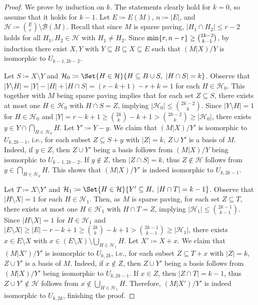 \documentclass{article}
\DeclarePairedDelimiter{\set}{\{}{\}}
\theoremstyle{definition}
\newcommand{\cH}{\mathcal{H}}
\begin{document}
\begin{proof}
We prove by induction on $k$. The statements clearly hold for $k=0$, so assume that it holds for $k-1$. Let $E\coloneqq E(M)$, $n \coloneqq |E|$, and $\cH\coloneqq \binom{E}{r} \setminus \mathcal{B}(M)$.
Recall that since $M$ is sparse paving, $|H_1 \cap H_2| \le r-2$ holds for all $H_1, H_2\in \cH$ with $H_1 \ne H_2$.
Since $\min\set{r, n-r} \ge \binom{2k-2}{k-1}$, by induction there exist $X, Y$ with $Y \subseteq B \subseteq X \subseteq E$ such that $(M|X) / Y$ is isomorphic to $U_{k-1, 2k-2}$.

Let $S\coloneqq X \setminus Y$ and $\cH_0 \coloneqq \Set{H\in \cH}{H \subseteq B\cup S,\ |H\cap S| = k}$.
Observe that $|Y \setminus H| = |Y|-|H|+|H\cap S| = (r-k+1) - r + k = 1$ for each $H\in \cH_0$.
This together with $M$ being sparse paving implies that for each set $Z\subseteq S$, there exists at most one $H\in \cH_0$ with $H\cap S = Z$, implying $|\cH_0| \le \binom{2k-2}{k}$.
Since $|Y \setminus H| = 1$ for $H \in \cH_0$ and $|Y| = r-k+1 \ge \binom{2k}{k}-k+1 > \binom{2k-2}{k} \ge |\cH_0|$, there exists $y\in Y \cap \bigcap_{H \in \cH_0} H$.
Let $Y'\coloneqq Y-y$.
We claim that $(M|X)/ Y'$ is isomorphic to $U_{k, 2k-1}$, i.e., for each subset $Z\subseteq S + y$ with $|Z|=k$, $Z \cup Y'$ is a basis of $M$.
Indeed, if $y \in Z$, then $Z \cup Y'$ being a basis follows from $(M|X) / Y$ being isomorphic to $U_{k-1, 2k-2}$.
If $y \notin Z$, then $|Z\cap S| = k$, thus $Z\not \in \cH$ follows from $y \in \bigcap_{H \in \cH_0} H$.
This shows that $(M|X)/ Y'$ is indeed isomorphic to $U_{k, 2k-1}$.

Let $T\coloneqq X \setminus Y'$ and $\cH_1\coloneqq \Set{H \in \cH}{Y' \subseteq H,\ |H\cap T| = k-1}$.
Observe that $|H\setminus X| = 1$ for each $H\in \cH_1$.
Then, as $M$ is sparse paving, for each set $Z\subseteq T$, there exists at most one $H\in \cH_1$ with $H\cap T =Z$, implying $|\cH_1| \le \binom{2k-1}{k-1}$.
Since $|H \setminus X|=1$ for $H\in \cH_1$ and $|E \setminus X| \ge |E|-r -k+1 \ge \binom{2k}{k}-k+1 > \binom{2k-1}{k-1} \ge |\cH_1|$, there exists $x \in E \setminus X$ with $x \in (E \setminus X) \setminus \bigcup_{H \in \cH_1} H$.
Let $X'\coloneqq X + x$.
We claim that $(M|X') / Y'$ is isomorphic to $U_{k, 2k}$, i.e., for each subset $Z\subseteq T + x$ with $|Z|=k$, $Z \cup Y'$ is a basis of $M$.
Indeed, if $x \notin Z$, then $Z \cup Y'$ being a basis follows from $(M|X)/ Y'$ being isomorphic to $U_{k, 2k-1}$.
If $x \in Z$, then $|Z\cap T| = k-1$, thus $Z \cup Y' \notin \cH$ follows from $x \not \in \bigcup_{H\in \cH_1} H$.
Therefore, $(M|X') / Y'$ is indeed isomorphic to $U_{k, 2k}$, finishing the proof.  
\end{proof}
\end{document}
